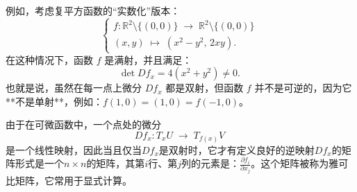 例如，考虑复平方函数的“实数化”版本：
  $$
  \begin{cases}
  f:\mathbb{R}^2 \setminus \{(0,0)\} \;\to\; \mathbb{R}^2 \setminus \{(0,0)\}\\
  (x,y) \;\mapsto\; (x^2 - y^2,\, 2xy).
  \end{cases}~
  $$
在这种情况下，函数 $f$ 是满射，并且满足：
  $$
  \det Df_x = 4(x^2 + y^2) \neq 0.~
  $$
也就是说，虽然在每一点上微分 $Df_x$ 都是双射，但函数 $f$ 并不是可逆的，因为它**不是单射**，例如：$f(1,0) = (1,0) = f(-1,0)$。

由于在可微函数中，一个点处的微分
  $$
  Df_x: T_xU \;\to\; T_{f(x)}V~
  $$
是一个线性映射，因此当且仅当$Df_x$是双射时，它才有定义良好的逆映射$Df_x$的矩阵形式是一个$n \times n$的矩阵，其第$i$行、第$j$列的元素是：$\frac{\partial f_i}{\partial x_j}$。这个矩阵被称为雅可比矩阵，它常用于显式计算。